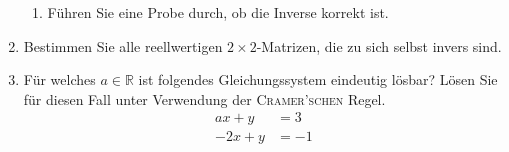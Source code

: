 \documentclass[12pt,a4paper]{scrreprt}
\newcommand{\R}{\mathds{R}}
\begin{document}
\begin{enumerate}
\begin{enumerate}
		\item Führen Sie eine Probe durch, ob die Inverse korrekt ist.
\begin{comment}
A*A^{-1} = I_3
\end{comment}
	\end{enumerate}

	\item Bestimmen Sie alle  reellwertigen $2 \times 2$-Matrizen, die zu sich selbst invers sind.
\begin{comment}
A=\begin{pmatrix}a b \\ a b\end{pmatrix}
A=A^{-1}
AA^{-1}=I_2 \Rightarrow AA=I-2
\begin{tabular}{rr|rr}
	&	&	a &	b \\
	&	&	c &	d \\
 a	& d	& a^2+bc & ab+bd \\
 c	& d	& ac+cd	& bc+d^2 
\end{tabular}
welche vier Zahlen erfüülen die Einheitsmatrix hier?
\end{comment}

	\item
Für welches $a \in \R$ ist folgendes Gleichungssystem eindeutig lösbar? Lösen Sie für diesen Fall unter Verwendung der \textsc{Cramer'schen} Regel.
\begin{align*}
					 ax+y &= 3 \\
					-2x +y &=-1
\end{align*}
\begin{comment}
CRAMERsche Regel - nur anwendbar wenn LGS eindeutig lösbar (d.h. det(A) \neq 0 )
\Rightleftarrow A\vec{x}=\vec{b}
mit A=\begin{pmatrix} a 1 \\ -2 1 \end{pmatrix}, \vec{x}=\begin{pmatrix} x \\ y \end{pmatrix}, \vec{b}=\begin{pmatrix} 3 \\ -1 \end{pmatrix}
det(A)=a-2 \Rightarrow lösbar für a \neq -2
x=\frac{det A_1}{det A} = \frac{4}{a-2}
y=\frac{det A_2}{det A} = \frac{-a+6}{a-2}
\end{comment}



\end{enumerate}
\end{document}
